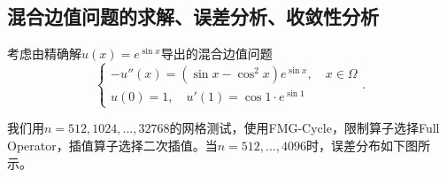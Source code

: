 \documentclass[lang=cn,10pt]{elegantbook}
\begin{document}
\subsection{混合边值问题的求解、误差分析、收敛性分析}

考虑由精确解$u(x)=e^{\sin x}$导出的混合边值问题
\begin{equation}
  \left\{
    \begin{array}{l}
      -u''(x) = (\sin x-\cos^2 x)e^{\sin x},\quad x\in\Omega \\
      u(0)=1,\quad u'(1)=\cos 1\cdot e^{\sin 1}
    \end{array}
  \right. .
\end{equation}

我们用$n=512,1024,...,32768$的网格测试，使用FMG-Cycle，限制算子选择Full Operator，插值算子选择二次插值。当$n=512,...,4096$时，误差分布如下图所示。
\end{document}
